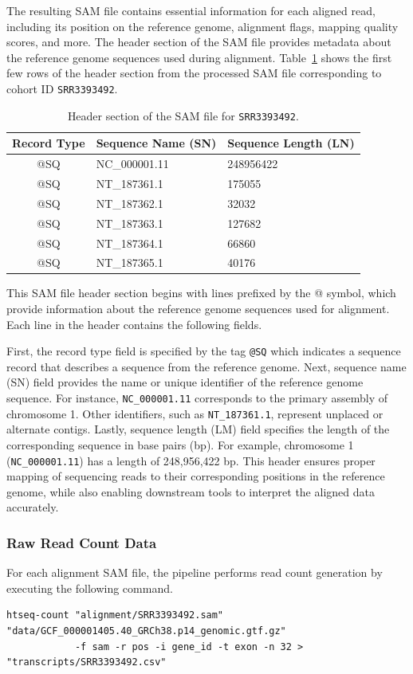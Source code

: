 The resulting SAM file contains essential information for each aligned read, including its position on the reference genome, alignment flags, mapping quality scores, and more. The header section of the SAM file provides metadata about the reference genome sequences used during alignment. Table~\ref{table:sam_header} shows the first few rows of the header section from the processed SAM file corresponding to cohort ID \texttt{SRR3393492}.
\begin{table}[H]
    \centering
    \begin{tabular}{cll}
        \toprule
        Record Type & Sequence Name (SN) & Sequence Length (LN) \\
        \midrule
        @SQ & NC\_000001.11 & 248956422 \\
        @SQ & NT\_187361.1 & 175055 \\
        @SQ & NT\_187362.1 & 32032 \\
        @SQ & NT\_187363.1 & 127682 \\
        @SQ & NT\_187364.1 & 66860 \\
        @SQ & NT\_187365.1 & 40176 \\
        \bottomrule
    \end{tabular}
    \caption{Header section of the SAM file for \texttt{SRR3393492}.}
    \label{table:sam_header}
\end{table}
This SAM file header section begins with lines prefixed by the @ symbol, which provide information about the reference genome sequences used for alignment. Each line in the header contains the following fields.

First, the record type field is specified by the tag \texttt{@SQ} which indicates a sequence record that describes a sequence from the reference genome. Next, sequence name (SN) field provides the name or unique identifier of the reference genome sequence. For instance, \texttt{NC\_000001.11} corresponds to the primary assembly of chromosome 1. Other identifiers, such as \texttt{NT\_187361.1}, represent unplaced or alternate contigs. Lastly, sequence length (LM) field specifies the length of the corresponding sequence in base pairs (bp). For example, chromosome 1 (\texttt{NC\_000001.11}) has a length of 248,956,422 bp. This header ensures proper mapping of sequencing reads to their corresponding positions in the reference genome, while also enabling downstream tools to interpret the aligned data accurately.



\subsubsection{Raw Read Count Data}
For each alignment SAM file, the pipeline performs read count generation by executing the following command.
\begin{verbatim}
htseq-count "alignment/SRR3393492.sam" "data/GCF_000001405.40_GRCh38.p14_genomic.gtf.gz"
            -f sam -r pos -i gene_id -t exon -n 32 > "transcripts/SRR3393492.csv"
\end{verbatim}
